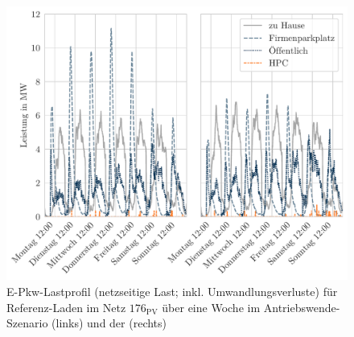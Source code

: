 \begin{figure}[H]
    \centering
    \includegraphics[width=\textwidth]{Bilder/example_load_profile}
    \caption[E-Pkw-Lastprofil für Referenz-Laden im Netz \num{176} über eine Woche im Antriebswende-Szenario und der \SzeFirmenparkplatz]{E-Pkw-Lastprofil (netzseitige Last; inkl. Umwandlungsverluste) für Referenz-Laden im Netz \(176_{\text{PV}}\) über eine Woche im Antriebswende-Szenario (links) und der \SzeFirmenparkplatz (rechts)}\label{fig:example_load_profile}
\end{figure}